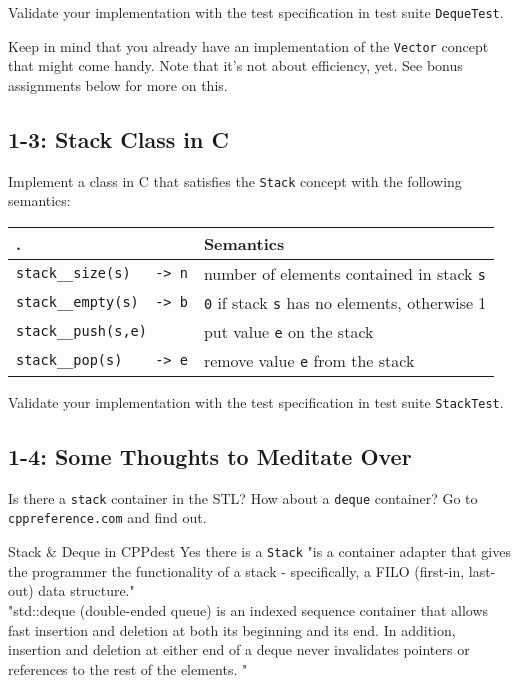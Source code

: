 \documentclass[]{article}
\begin{document}
Validate your implementation with the test specification in test suite
\texttt{DequeTest}.

Keep in mind that you already have an implementation of the
\texttt{Vector} concept that might come handy. Note that it's not about
efficiency, yet. See bonus assignments below for more on this.

\subsection{1-3: Stack Class in C}\label{stack-class-in-c}

Implement a class in C that satisfies the \texttt{Stack} concept with
the following semantics:

\begin{longtable}[c]{@{}ll@{}}
\toprule
. & Semantics \tabularnewline
\midrule
\endhead
\texttt{stack\_\_size(s)\ \ \ -\textgreater{}\ n} & number of elements
contained in stack \texttt{s}\tabularnewline
\texttt{stack\_\_empty(s)\ \ -\textgreater{}\ b} & \texttt{0} if stack
\texttt{s} has no elements, otherwise 1\tabularnewline
\texttt{stack\_\_push(s,e)} & put value \texttt{e} on the
stack\tabularnewline
\texttt{stack\_\_pop(s)\ \ \ \ -\textgreater{}\ e} & remove value
\texttt{e} from the stack\tabularnewline
\bottomrule
\end{longtable}

Validate your implementation with the test specification in test suite
\texttt{StackTest}.

\subsection{1-4: Some Thoughts to Meditate
Over}\label{some-thoughts-to-meditate-over}

Is there a \texttt{stack} container in the STL? How about a
\texttt{deque} container? Go to \texttt{cppreference.com} and find out.
  \begin{example}{Stack \& Deque in CPP}{dest}
    Yes there is a \texttt{Stack} "is a container adapter that gives the
    programmer the functionality of a stack - specifically, a FILO (first-in,
    last-out) data structure."\\
    "std::deque (double-ended queue) is an indexed sequence container that
    allows fast insertion and deletion at both its beginning and its end. In
    addition, insertion and deletion at either end of a deque never invalidates
    pointers or references to the rest of the elements. "
  \end{example}
\end{document}
